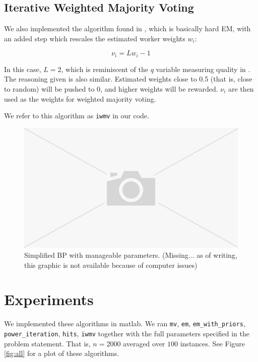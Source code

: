 \documentclass[11pt]{article}
\begin{document}
\subsection{Iterative Weighted Majority Voting}

We also implemented the algorithm found in \cite{li2014error}, which is basically hard EM, with an added step which rescales the estimated worker weights $w_i$:

\[ \nu_i = Lw_i - 1 \]

In this case, $L=2$, which is reminiscent of the $q$ variable measuring quality in \cite{karger2014budget}. The reasoning given is also similar. Estimated weights close to 0.5 (that is, close to random) will be pushed to 0, and higher weights will be rewarded. $\nu_i$ are then used as the weights for weighted majority voting.

We refer to this algorithm as \texttt{iwmv} in our code.

\begin{figure}[t]
\centering
\includegraphics[scale=0.3]{missing.png}
\caption{Simplified BP with manageable parameters. (Missing... as of writing, this graphic is not available because of computer issues)}
\label{fig:simp}
\end{figure}

\section{Experiments}
We implemented these algorithms in matlab. We ran \texttt{mv}, \texttt{em}, \texttt{em\_with\_priors}, \texttt{power\_iteration}, \texttt{hits}, \texttt{iwmv} together with the full parameters specified in the problem statement. That is, $n=2000$ averaged over $100$ instances. See Figure \ref{fig:all} for a plot of these algorithms.
\end{document}
